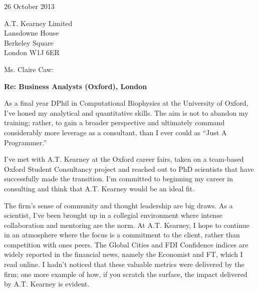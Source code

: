 \documentclass{../res}
\begin{document}
 
\begin{sloppypar}
 
%


\begin{resume} 
 
\vspace{1\baselineskip}

26 October 2013
\vspace{1\baselineskip}

A.T. Kearney Limited \\
Lansdowne House \\
Berkeley Square \\
London W1J 6ER
\vspace{1\baselineskip}

Ms. Claire Caw: %

\textbf{Re: Business Analysts (Oxford), London}

As a final year DPhil in Computational Biophysics at the University of Oxford, I've honed my analytical and quantitative skills. The aim is not to abandon my training; rather, to gain a broader perspective and ultimately command considerably more leverage as a consultant, than I ever could as ``Just A Programmer.''

I've met with A.T. Kearney at the Oxford career fairs, taken on a team-based Oxford Student Consultancy project and reached out to PhD scientists that have successfully made the transition. I'm committed to beginning my career in consulting and think that A.T. Kearney would be an ideal fit. 

The firm's sense of community and thought leadership are big draws. As a scientist, I've been brought up in a collegial environment where intense collaboration and mentoring are the norm. At A.T. Kearney, I hope to continue in an atmosphere where the focus is a commitment to the client, rather than competition with ones peers. The Global Cities and FDI Confidence indices are widely reported in the financial news, namely the Economist and FT, which I read online. I hadn't noticed that these valuable metrics were delivered by the firm; one more example of how, if you scratch the surface, the impact delivered by A.T. Kearney is evident.


\end{resume}
\end{sloppypar}
\end{document}
